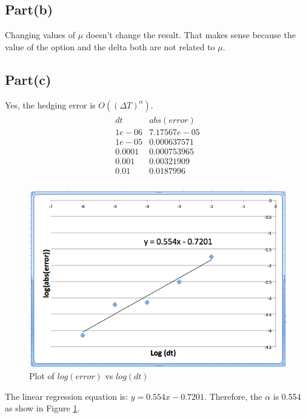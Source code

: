 \documentclass{report}
\begin{document}
\subsection*{Part(b)} 
Changing values of $\mu$ doesn't change the result. That makes sense because the value of the option and the delta both are not related to $\mu$. 

\subsection*{Part(c)} 
Yes, the hedging error is $O((\Delta T)^\alpha)$. 
\begin{align*}\begin{array}{ll}
dt & abs(error)  \\
 1e-06 &  7.17567e-05\\
1e-05  &	0.000637571\\
0.0001&	0.000753965\\
0.001&	0.00321909\\
0.01	&    0.0187996\\
\end{array}\end{align*}
\begin{figure}
\caption{Plot of $log(error)$  vs  $log(dt) $ }
\label{fig:log}
\centering
\includegraphics[width=\textwidth]{log_dt}
\end{figure}
The linear regression equation is:  $ y=0.554x-0.7201$. Therefore, the $\alpha$ is 0.554 as show in Figure \ref{fig:log}. \\
\end{document}
